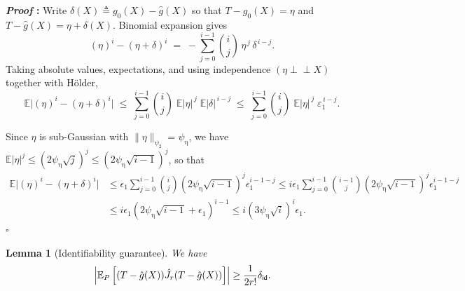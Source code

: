 \documentclass{article}
\def\eps{{\epsilon}}
\newcommand{\E}{\mathbb{E}}
\def\defeq{\triangleq} %
\newtheorem{lemma}{Lemma}[section]
\renewenvironment{proof}{\noindent\textbf{\textit{Proof }:}}{\hfill$\square$}
\newcommand{\ind}{\perp\!\!\!\!\perp}
\begin{document}
\begin{proof}
Write $\delta(X)\defeq g_0(X)-\hat g(X)$ so that  
$T-g_0(X)=\eta$ and $T-\hat g(X)=\eta+\delta(X)$.  
Binomial expansion gives
\[
(\eta)^i-(\eta+\delta)^i
 \;=\;
-\sum_{j=0}^{i-1}\binom{i}{j}\,\eta^{\,j}\,\delta^{\,i-j}.
\]
Taking absolute values, expectations, and using independence  
$(\eta\ind X)$ together with H\"older,
\[
\E\bigl|(\eta)^i-(\eta+\delta)^i\bigr|
 \;\le\;
\sum_{j=0}^{i-1}\binom{i}{j}\;
\E|\eta|^{\,j}\;\E|\delta|^{\,i-j}
 \;\le\;
\sum_{j=0}^{i-1}\binom{i}{j}\;
\E|\eta|^{\,j}\;\varepsilon_1^{\,i-j}.
\tag{A}
\]

Since $\eta$ is sub-Gaussian with $\|\eta\|_{\psi_2}=\psi_{\upeta}$, we have $\E|\eta|^j \leq (2\psi_{\upeta}\sqrt{j})^j \leq (2\psi_{\upeta}\sqrt{i-1})^j$, so that
\[
\begin{aligned}
\E\bigl|(\eta)^i-(\eta+\delta)^i\bigr|
 &\le
 \eps_{1}\sum_{j=0}^{i-1}\binom{i}{j} (2\psi_{\upeta}\sqrt{i-1})^j \eps_1^{i-1-j} \leq i\eps_1 \sum_{j=0}^{i-1}\binom{i-1}{j} (2\psi_{\upeta}\sqrt{i-1})^j \eps_1^{i-1-j} \\
 &\leq i\eps_1(2\psi_{\upeta}\sqrt{i-1}+\eps_1)^{i-1} \leq i(3\psi_{\upeta}\sqrt{i})^i\eps_1.
\end{aligned}
\]
\end{proof}


\begin{lemma}[Identifiability guarantee]
    \label{lemma:independent-noise-identification}
    We have
    \begin{equation}
        \notag
        \left|\E_{P}\left[ (T-\hat{g}(X))\hat{J}_r(T-\hat{g}(X)) \right]\right| \geq \frac{1}{2r!} \delta_{\mathsf{id}}.
    \end{equation}
\end{lemma}
\end{document}
